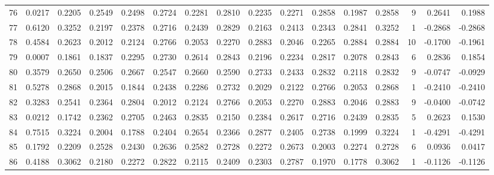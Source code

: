 \begin{tabular}{lrrrrrrrrrrrrrrr}
76  &      0.0217 &  0.2205 &  0.2549 &  0.2498 &  0.2724 &  0.2281 &  0.2810 &  0.2235 &  0.2271 &  0.2858 &   0.1987 &     0.2858 &      9 &                    0.2641 &                     0.1988 \\
77  &      0.6120 &  0.3252 &  0.2197 &  0.2378 &  0.2716 &  0.2439 &  0.2829 &  0.2163 &  0.2413 &  0.2343 &   0.2841 &     0.3252 &      1 &                   -0.2868 &                    -0.2868 \\
78  &      0.4584 &  0.2623 &  0.2012 &  0.2124 &  0.2766 &  0.2053 &  0.2270 &  0.2883 &  0.2046 &  0.2265 &   0.2884 &     0.2884 &     10 &                   -0.1700 &                    -0.1961 \\
79  &      0.0007 &  0.1861 &  0.1837 &  0.2295 &  0.2730 &  0.2614 &  0.2843 &  0.2196 &  0.2234 &  0.2817 &   0.2078 &     0.2843 &      6 &                    0.2836 &                     0.1854 \\
80  &      0.3579 &  0.2650 &  0.2506 &  0.2667 &  0.2547 &  0.2660 &  0.2590 &  0.2733 &  0.2433 &  0.2832 &   0.2118 &     0.2832 &      9 &                   -0.0747 &                    -0.0929 \\
81  &      0.5278 &  0.2868 &  0.2015 &  0.1844 &  0.2438 &  0.2286 &  0.2732 &  0.2029 &  0.2122 &  0.2766 &   0.2053 &     0.2868 &      1 &                   -0.2410 &                    -0.2410 \\
82  &      0.3283 &  0.2541 &  0.2364 &  0.2804 &  0.2012 &  0.2124 &  0.2766 &  0.2053 &  0.2270 &  0.2883 &   0.2046 &     0.2883 &      9 &                   -0.0400 &                    -0.0742 \\
83  &      0.0212 &  0.1742 &  0.2362 &  0.2705 &  0.2463 &  0.2835 &  0.2150 &  0.2384 &  0.2617 &  0.2716 &   0.2439 &     0.2835 &      5 &                    0.2623 &                     0.1530 \\
84  &      0.7515 &  0.3224 &  0.2004 &  0.1788 &  0.2404 &  0.2654 &  0.2366 &  0.2877 &  0.2405 &  0.2738 &   0.1999 &     0.3224 &      1 &                   -0.4291 &                    -0.4291 \\
85  &      0.1792 &  0.2209 &  0.2528 &  0.2430 &  0.2636 &  0.2582 &  0.2728 &  0.2272 &  0.2673 &  0.2003 &   0.2274 &     0.2728 &      6 &                    0.0936 &                     0.0417 \\
86  &      0.4188 &  0.3062 &  0.2180 &  0.2272 &  0.2822 &  0.2115 &  0.2409 &  0.2303 &  0.2787 &  0.1970 &   0.1778 &     0.3062 &      1 &                   -0.1126 &                    -0.1126 \\

\end{tabular}
